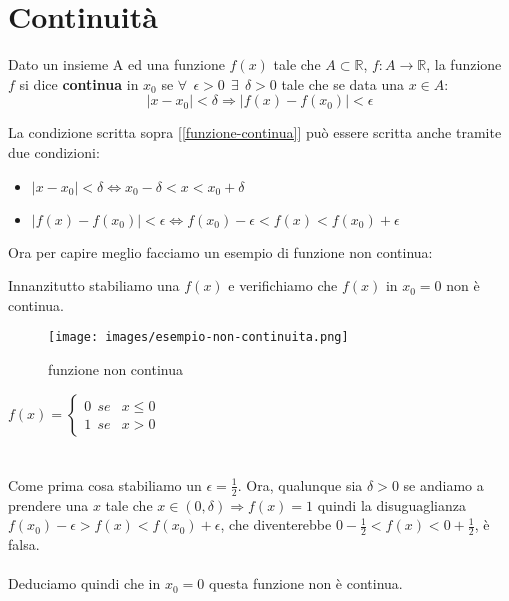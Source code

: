\newpage
\section{Continuità}
\begin{definition}
    Dato un insieme A ed una funzione $f(x)$ tale che $A \subset \mathbb{R}$, $f: A \longrightarrow \mathbb{R}$, la funzione $f$ si dice \textbf{continua} in $x_0$ se $\forall \: \: \epsilon > 0 \: \: \exists \: \: \delta > 0$ tale che se data una $x \in A$:
    \begin{equation}\label{funzione-continua}
        |x - x_0| < \delta \Longrightarrow |f(x) - f(x_0)| < \epsilon
    \end{equation}
\end{definition}
La condizione scritta sopra [\ref{funzione-continua}] può essere scritta anche tramite due condizioni:
\begin{itemize}
    \item $|x - x_0| < \delta \Longleftrightarrow x_0 - \delta < x < x_0 + \delta$
    \item $|f(x) - f(x_0)| < \epsilon \Longleftrightarrow f(x_0) - \epsilon < f(x) < f(x_0) + \epsilon$
\end{itemize}
\begin{example}
Ora per capire meglio facciamo un esempio di funzione non continua:
\end{example}
Innanzitutto stabiliamo una $f(x)$ e verifichiamo che $f(x)$ in $x_0 = 0$ non è continua.\\ 
\begin{wrapfigure}{r}{8cm}
\vspace{-20pt}
    \centering
    \texttt{[image: images/esempio-non-continuita.png]}
    \caption{funzione non continua}
    \label{fig:funzione-non-continua}
\end{wrapfigure}

$
  f(x)=\begin{cases}
    0 \: \: se & x \leq 0\\
    1 \: \: se & x > 0
  \end{cases}
$\\ \\ \\
Come prima cosa stabiliamo un $\epsilon = \frac{1}{2}$. Ora, qualunque sia $\delta > 0$ se andiamo a prendere una $x$ tale che $x \in (0, \delta) \Longrightarrow f(x) = 1$ quindi la disuguaglianza $f(x_0) - \epsilon > f(x) < f(x_0) + \epsilon$, che diventerebbe $0 - \frac{1}{2} < f(x) < 0 + \frac{1}{2}$, è falsa. \\ \\
Deduciamo quindi che in $x_0 = 0$ questa funzione non è continua. \\ \\

